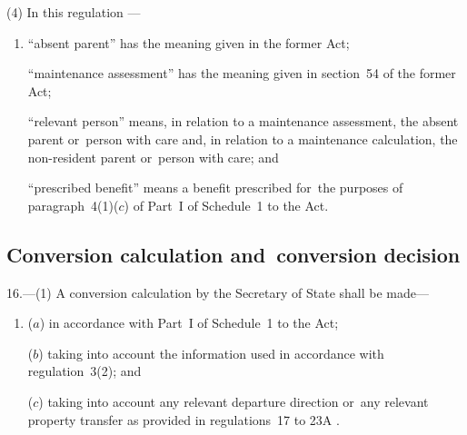 \documentclass[12pt,a4paper]{article}
\begin{document}
(4) In 
this regulation%
—
\begin{enumerate}\item[]
“absent parent” has the meaning given in the former Act;

“maintenance assessment” has the meaning given in section~54 of the former Act;

    “relevant person” means, in relation to a maintenance assessment, the absent parent
or~person with care and, in relation to a maintenance calculation, the non-resident parent or~person with care; and

    “prescribed benefit” means a benefit prescribed for~the purposes of paragraph~4(1)($c$)  of Part~I of Schedule~1 to the Act. 
\end{enumerate}


\subsection[16. Conversion calculation and~conversion decision]{Conversion calculation and~conversion decision}

16.---(1)  A conversion calculation by the Secretary of State shall be made—
\begin{enumerate}\item[]
($a$) in accordance with Part~I of Schedule~1 to the Act;


($b$) taking into account the information used in accordance with regulation~3(2); and

($c$) taking into account any relevant departure direction or~any relevant property transfer as provided in regulations~17 to 
23A%
.
\end{enumerate}
\end{document}
